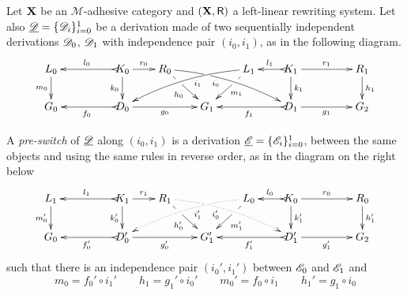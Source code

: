 \begin{definition} \label{def:switch}
	Let $\textbf {\textup{X}}$ be an $\mathcal{M}$-adhesive category 
	and $(\textbf {\textup{X}}, \mathsf{R})$ a left-linear rewriting system. 
	Let also
	$\underline{\mathscr{D}}=\{\mathscr{D}_i\}_{i=0}^1$ be a derivation made
	of two sequentially independent derivations $\mathscr{D}_0$,
	$\mathscr{D}_1$ with independence pair $(i_0, i_1)$, as in the following diagram. 
		\[\xymatrix@R=20pt@C=20pt{L_0 \ar[d]_{m_0}&& K_0
		\ar[d]_{k_0}\ar@{>->}[ll]_{l_0} \ar[r]^{r_0} & R_0
		\ar@{>}@/^.25cm/[drrr]|(.32)\hole_(.4){i_0}
		\ar[dr]|(.33)\hole_{h_0} && L_1 \ar@{>}@/_.25cm/[dlll]^(.4){i_1}
		\ar[dl]|(.33)\hole^{m_1}& K_1 \ar[d]^{k_1}\ar@{>->}[l]_{l_1}
		\ar[rr]^{r_1} && R_1 \ar[d]^{h_1}\\G_0 && \ar@{>->}[ll]^{f_0}
		D_0 \ar[rr]_{g_0}&& G_1 && \ar@{>->}[ll]^{f_1} D_1
		\ar[rr]_{g_1}&& G_2}
	\]
	
	
	A \emph{pre-switch} of $\underline{\mathscr{D}}$ along $(i_0,i_1)$ is
	a derivation $\underline{\mathscr{E}}=\{\mathscr{E}_i\}_{i=0}^1$, between the same objects and using the same rules
	in reverse order, as in the diagram on the right below
	\[
	\xymatrix@R=20pt@C=20pt{
		{L_1} \ar[d]_{m_0'}
		&&  {K_1} \ar@{>->}[ll]_{l_1} \ar[r]^{r_1} \ar[d]_{k_0'}
		&  {R_1} \ar[dr]|(.33)\hole_{h_0'}  \ar@/^.25cm/@{.>}_(.4){i_0'}|(.32)\hole[drrr]
		& & 
		{L_0}\ar[dl]|(.33)\hole^{m_1'} \ar@/_.25cm/@{.>}^(.4){i_1'}[dlll] 
		&  {K_0} \ar@{>->}[l]_{l_0} \ar[rr]^{r_0} \ar[d]^{k_1'}
		& & {R_0} \ar[d]^{h_1'} \\		
		{G_0}
		& & {D_0'} \ar@{>->}[ll]^{f_0'} \ar[rr]_{g_0'}
		& &  {G'_1} 
		& &  {D_1'} \ar@{>->}[ll]^{f_1'} \ar[rr]_{g_1'}
		& & {G_2}  }
	\]
	such that there is an independence pair $(i_0', i_1')$ between
	$\mathscr{E}_0$ and $\mathscr{E}_1$ and 
\[
	m_0=f_0' \circ i_1' \qquad 
	h_1=g_1' \circ i_0' 
		\qquad m_0'= f_0 \circ i_1
		\qquad h_1'= g_{1}\circ i_0\]
	

\end{definition}

